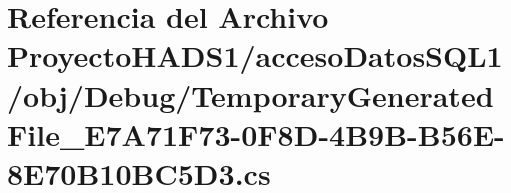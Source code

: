 \hypertarget{_proyecto_h_a_d_s1_2acceso_datos_s_q_l1_2obj_2_debug_2_temporary_generated_file___e7_a71_f73-0_fc1908bf36684b64d0024eb0856f5d5e3}{}\section{Referencia del Archivo Proyecto\+H\+A\+D\+S1/acceso\+Datos\+S\+Q\+L1/obj/\+Debug/\+Temporary\+Generated\+File\+\_\+\+E7\+A71\+F73-\/0\+F8\+D-\/4\+B9\+B-\/\+B56\+E-\/8\+E70\+B10\+B\+C5\+D3.cs}
\label{_proyecto_h_a_d_s1_2acceso_datos_s_q_l1_2obj_2_debug_2_temporary_generated_file___e7_a71_f73-0_fc1908bf36684b64d0024eb0856f5d5e3}
